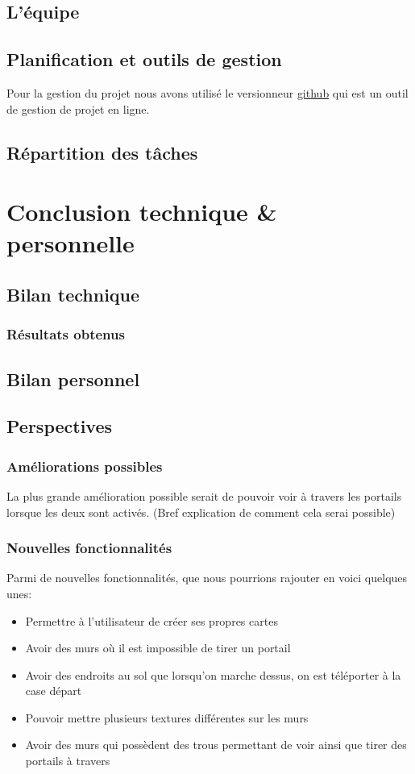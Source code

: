 \documentclass[11pt]{article}
\begin{document}
\subsection{L'équipe}
\subsection{Planification et outils de gestion}

Pour la gestion du projet nous avons utilisé le versionneur \href{https://github.com/}{github}\cite{Github} 
qui est un outil de gestion de projet en ligne.

\subsection{Répartition des tâches}


\section{Conclusion technique \& personnelle}
\subsection{Bilan technique}
\subsubsection{Résultats obtenus}
\subsection{Bilan personnel}
\subsection{Perspectives}
\subsubsection{Améliorations possibles}

La plus grande amélioration possible serait de pouvoir voir à travers les portails
lorsque les deux sont activés. (Bref explication de comment cela serai possible)

\subsubsection{Nouvelles fonctionnalités}

Parmi de nouvelles fonctionnalités, que nous pourrions rajouter en voici quelques unes:
\begin{itemize}
	\item Permettre à l'utilisateur de créer ses propres cartes
	\item Avoir des murs où il est impossible de tirer un portail
	\item Avoir des endroits au sol que lorsqu'on marche dessus, on est téléporter à la case départ
	\item Pouvoir mettre plusieurs textures différentes sur les murs
	\item Avoir des murs qui possèdent des trous permettant de voir ainsi que tirer des portails à travers
\end{itemize}
\end{document}
